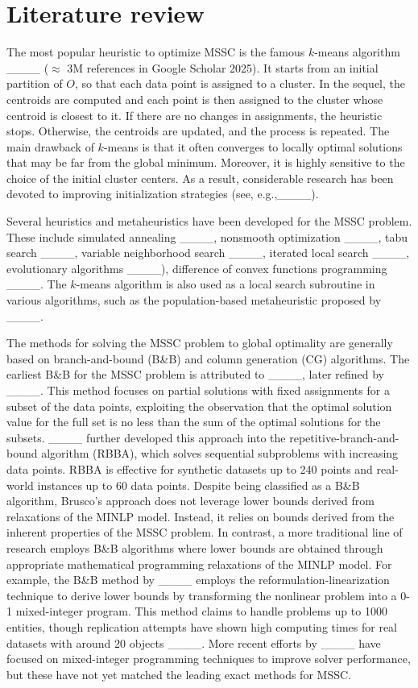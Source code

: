 \section{Literature review}
\label{sec:lit}

The most popular heuristic to optimize MSSC is the famous $k$-means algorithm ____ ($\approx$ 3M references in Google Scholar 2025). It starts from an initial partition of $O$, so that each data point is assigned to a cluster. In the sequel, the centroids are computed and each point is then assigned to the cluster whose centroid is closest to it. If there are no changes in assignments, the heuristic stops. Otherwise, the
centroids are updated, and the process is repeated. The main drawback of $k$-means is that it often converges to locally optimal solutions that may be far from the global minimum. Moreover, it is highly sensitive to the choice of the initial cluster centers. As a result, considerable research has been devoted to improving initialization strategies (see, e.g.,____). 

Several heuristics and metaheuristics have been developed for the MSSC problem. These include simulated annealing ____, nonsmooth optimization ____, tabu search ____, variable neighborhood search ____, iterated local search ____, evolutionary algorithms ____), difference of convex functions programming ____. The \(k\)-means algorithm is also used as a local search subroutine in various algorithms, such as the population-based metaheuristic proposed by ____.

The methods for solving the MSSC problem to global optimality are generally based on branch-and-bound (B\&B) and column generation (CG) algorithms. The earliest B\&B for the MSSC problem is attributed to ____, later refined by ____. This method focuses on partial solutions with fixed assignments for a subset of the data points, exploiting the observation that the optimal solution value for the full set is no less than the sum of the optimal solutions for the subsets. ____ further developed this approach into the repetitive-branch-and-bound algorithm (RBBA), which solves sequential subproblems with increasing data points. RBBA is effective for synthetic datasets up to 240 points and real-world instances up to 60 data points. Despite being classified as a B\&B algorithm, Brusco's approach does not leverage lower bounds derived from relaxations of the MINLP model. Instead, it relies on bounds derived from the inherent properties of the MSSC problem. In contrast, a more traditional line of research employs B\&B algorithms where lower bounds are obtained through appropriate mathematical programming relaxations of the MINLP model. For example, the B\&B method by ____ employs the reformulation-linearization technique to derive lower bounds by transforming the nonlinear problem into a 0-1 mixed-integer program. This method claims to handle problems up to 1000 entities, though replication attempts have shown high computing times for real datasets with around 20 objects ____. More recent efforts by ____ have focused on mixed-integer programming techniques to improve solver performance, but these have not yet matched the leading exact methods for MSSC.


